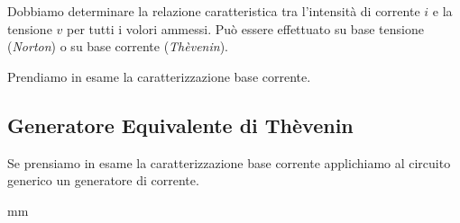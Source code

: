 \documentclass[a4paper]{report}
\begin{document}
\vspace{1cm}

Dobbiamo determinare la relazione caratteristica tra l'intensit\`a di
corrente $i$ e la tensione $v$ per tutti i volori ammessi.
Pu\`o essere effettuato su base tensione (\emph{Norton}) o su base
corrente (\emph{Th\`evenin}).

Prendiamo in esame la caratterizzazione base corrente.

\subsection{Generatore Equivalente di Th\`evenin}
Se prensiamo in esame la caratterizzazione base corrente applichiamo
al circuito generico un generatore di corrente.

\ifx\JPicScale\undefined{}\fi
\unitlength \JPicScale mm
\end{document}
